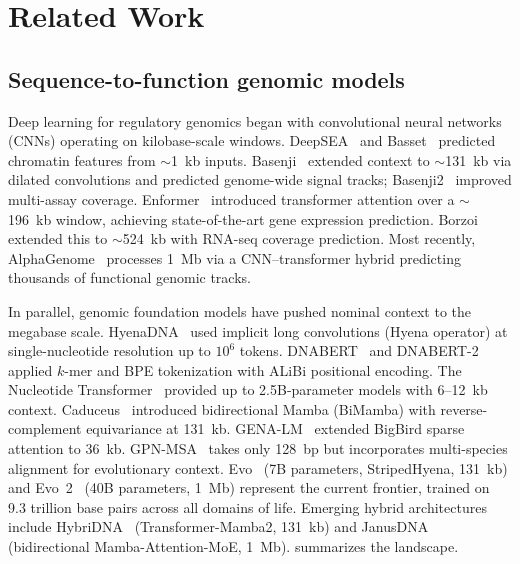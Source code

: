 \section{Related Work}\label{sec:related}

\subsection{Sequence-to-function genomic models}

Deep learning for regulatory genomics began with convolutional neural networks (CNNs) operating on kilobase-scale windows. DeepSEA~\citep{Zhou2015DeepSEA} and Basset~\citep{Kelley2016Basset} predicted chromatin features from $\sim$1~kb inputs. Basenji~\citep{Kelley2018Basenji} extended context to $\sim$131~kb via dilated convolutions and predicted genome-wide signal tracks; Basenji2~\citep{Kelley2020Basenji2} improved multi-assay coverage. Enformer~\citep{Avsec2021Enformer} introduced transformer attention over a $\sim$196~kb window, achieving state-of-the-art gene expression prediction. Borzoi~\citep{Linder2025Borzoi} extended this to $\sim$524~kb with RNA-seq coverage prediction. Most recently, AlphaGenome~\citep{Benegas2026AlphaGenome} processes 1~Mb via a CNN--transformer hybrid predicting thousands of functional genomic tracks.

In parallel, genomic foundation models have pushed nominal context to the megabase scale. HyenaDNA~\citep{Nguyen2023HyenaDNA} used implicit long convolutions (Hyena operator) at single-nucleotide resolution up to $10^6$ tokens. DNABERT~\citep{Ji2021DNABERT} and DNABERT-2~\citep{Zhou2023DNABERT2} applied $k$-mer and BPE tokenization with ALiBi positional encoding. The Nucleotide Transformer~\citep{DallasTorre2024NT} provided up to 2.5B-parameter models with 6--12~kb context. Caduceus~\citep{Schiff2024Caduceus} introduced bidirectional Mamba (BiMamba) with reverse-complement equivariance at 131~kb. GENA-LM~\citep{Fishman2025GENA} extended BigBird sparse attention to 36~kb. GPN-MSA~\citep{Benegas2024GPNMSA} takes only 128~bp but incorporates multi-species alignment for evolutionary context. Evo~\citep{Nguyen2024Evo} (7B parameters, StripedHyena, 131~kb) and Evo~2~\citep{Brixi2025Evo2} (40B parameters, 1~Mb) represent the current frontier, trained on 9.3 trillion base pairs across all domains of life. Emerging hybrid architectures include HybriDNA~\citep{Chen2025HybriDNA} (Transformer-Mamba2, 131~kb) and JanusDNA~\citep{Chen2025JanusDNA} (bidirectional Mamba-Attention-MoE, 1~Mb).  summarizes the landscape.

